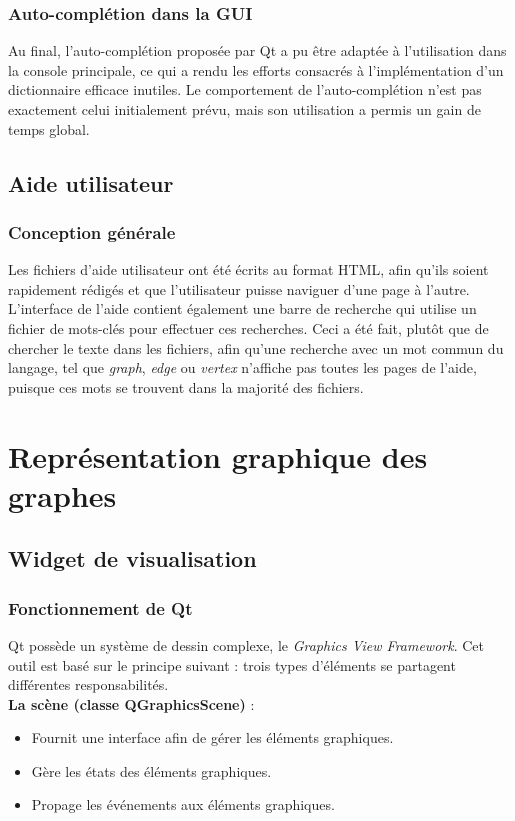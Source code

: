 \documentclass[french]{article}
\begin{document}
	\subsubsection{Auto-complétion dans la GUI}
	Au final, l'auto-complétion proposée par Qt a pu être adaptée à l'utilisation dans la console principale, ce qui a rendu les efforts consacrés à l'implémentation d'un dictionnaire efficace inutiles. Le comportement de l'auto-complétion n'est pas exactement celui initialement prévu, mais son utilisation a permis un gain de temps global.
	
	\subsection{Aide utilisateur}
	\subsubsection{Conception générale}
	Les fichiers d'aide utilisateur ont été écrits au format HTML, afin qu'ils soient rapidement rédigés et que l'utilisateur puisse naviguer d'une page à l'autre. L'interface de l'aide contient également une barre de recherche qui utilise un fichier de mots-clés pour effectuer ces recherches. Ceci a été fait, plutôt que de chercher le texte dans les fichiers, afin qu'une recherche avec un mot commun du langage, tel que \textit{graph}, \textit{edge} ou \textit{vertex} n'affiche pas toutes les pages de l'aide, puisque ces mots se trouvent dans la majorité des fichiers.

	\section{Représentation graphique des graphes}
	\subsection{Widget de visualisation}
	\subsubsection{Fonctionnement de Qt}
	Qt possède un système de dessin complexe, le \textit{Graphics View Framework}. Cet outil est basé sur le principe suivant : trois types d'éléments se partagent différentes responsabilités. \\
	
	\textbf{La scène (classe QGraphicsScene)} :
	\begin{itemize}
		\item Fournit une interface afin de gérer les éléments graphiques.
		\item Gère les états des éléments graphiques.
		\item Propage les événements aux éléments graphiques.
	\end{itemize}
	
\end{document}
